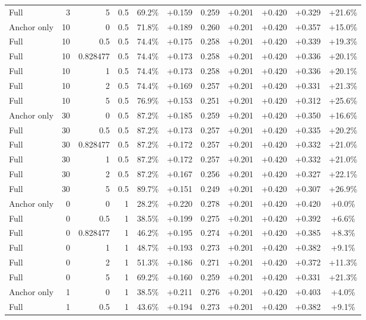 \begin{table}[htbp]
\begin{tabular}{lrrrccccccc}
Full & 3 & 5 & 0.5 & 69.2\% & +0.159 & 0.259 & +0.201 & +0.420 & +0.329 & +21.6\% \\
Anchor only & 10 & 0 & 0.5 & 71.8\% & +0.189 & 0.260 & +0.201 & +0.420 & +0.357 & +15.0\% \\
Full & 10 & 0.5 & 0.5 & 74.4\% & +0.175 & 0.258 & +0.201 & +0.420 & +0.339 & +19.3\% \\
Full & 10 & 0.828477 & 0.5 & 74.4\% & +0.173 & 0.258 & +0.201 & +0.420 & +0.336 & +20.1\% \\
Full & 10 & 1 & 0.5 & 74.4\% & +0.173 & 0.258 & +0.201 & +0.420 & +0.336 & +20.1\% \\
Full & 10 & 2 & 0.5 & 74.4\% & +0.169 & 0.257 & +0.201 & +0.420 & +0.331 & +21.3\% \\
Full & 10 & 5 & 0.5 & 76.9\% & +0.153 & 0.251 & +0.201 & +0.420 & +0.312 & +25.6\% \\
Anchor only & 30 & 0 & 0.5 & 87.2\% & +0.185 & 0.259 & +0.201 & +0.420 & +0.350 & +16.6\% \\
Full & 30 & 0.5 & 0.5 & 87.2\% & +0.173 & 0.257 & +0.201 & +0.420 & +0.335 & +20.2\% \\
Full & 30 & 0.828477 & 0.5 & 87.2\% & +0.172 & 0.257 & +0.201 & +0.420 & +0.332 & +21.0\% \\
Full & 30 & 1 & 0.5 & 87.2\% & +0.172 & 0.257 & +0.201 & +0.420 & +0.332 & +21.0\% \\
Full & 30 & 2 & 0.5 & 87.2\% & +0.167 & 0.256 & +0.201 & +0.420 & +0.327 & +22.1\% \\
Full & 30 & 5 & 0.5 & 89.7\% & +0.151 & 0.249 & +0.201 & +0.420 & +0.307 & +26.9\% \\
Anchor only & 0 & 0 & 1 & 28.2\% & +0.220 & 0.278 & +0.201 & +0.420 & +0.420 & +0.0\% \\
Full & 0 & 0.5 & 1 & 38.5\% & +0.199 & 0.275 & +0.201 & +0.420 & +0.392 & +6.6\% \\
Full & 0 & 0.828477 & 1 & 46.2\% & +0.195 & 0.274 & +0.201 & +0.420 & +0.385 & +8.3\% \\
Full & 0 & 1 & 1 & 48.7\% & +0.193 & 0.273 & +0.201 & +0.420 & +0.382 & +9.1\% \\
Full & 0 & 2 & 1 & 51.3\% & +0.186 & 0.271 & +0.201 & +0.420 & +0.372 & +11.3\% \\
Full & 0 & 5 & 1 & 69.2\% & +0.160 & 0.259 & +0.201 & +0.420 & +0.331 & +21.3\% \\
Anchor only & 1 & 0 & 1 & 38.5\% & +0.211 & 0.276 & +0.201 & +0.420 & +0.403 & +4.0\% \\
Full & 1 & 0.5 & 1 & 43.6\% & +0.194 & 0.273 & +0.201 & +0.420 & +0.382 & +9.1\% \\

\end{tabular}
\end{table}
